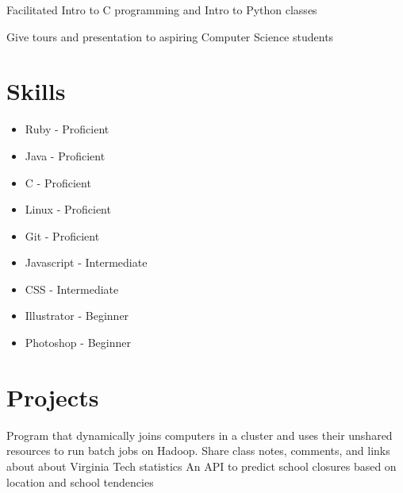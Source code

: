 \documentclass{my_cv}
\begin{document}


\workitemsone
 {Facilitated Intro to C programming and Intro to Python classes}

\workitemsone
 {Give tours and presentation to aspiring Computer Science students}

\section{Skills}
\begin{multicols}{3}
\begin{itemize}
    \item Ruby - Proficient
    \item Java - Proficient
    \item C - Proficient
    \item Linux - Proficient
    \item Git - Proficient
    \item Javascript - Intermediate
    \item CSS - Intermediate
    \item Illustrator - Beginner
    \item Photoshop - Beginner
    
\end{itemize}
\end{multicols}

\section{Projects}
\workitemsone
 { Program that dynamically joins computers in a cluster and uses their unshared resources to run batch jobs on Hadoop.}
\workitemsone
 { Share class notes, comments, and links about about Virginia Tech statistics }
\workitemsone
 { An API to predict school closures based on location and school tendencies }
\end{document}
